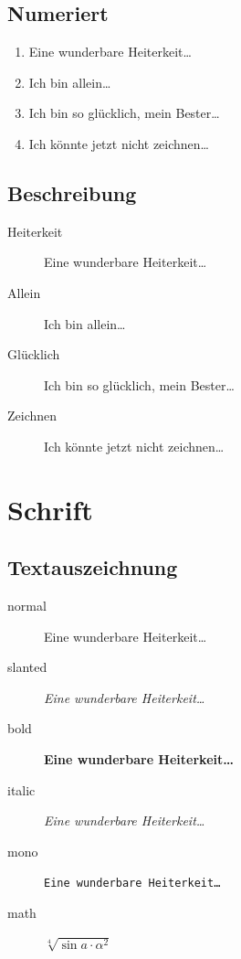 		\subsection{Numeriert}

		\begin{frame}{\insertsectionhead}{\insertsubsectionhead}
			\begin{enumerate}
				\item Eine wunderbare Heiterkeit\dots
				\item Ich bin allein\dots
				\item Ich bin so glücklich, mein Bester\dots
				\item Ich könnte jetzt nicht zeichnen\dots
			\end{enumerate}
		\end{frame}

		\subsection{Beschreibung}

		\begin{frame}{\insertsectionhead}{\insertsubsectionhead}
			\begin{description}
				\item[Heiterkeit] Eine wunderbare Heiterkeit\dots
				\item[Allein] Ich bin allein\dots
				\item[Glücklich] Ich bin so glücklich, mein Bester\dots
				\item[Zeichnen] Ich könnte jetzt nicht zeichnen\dots
			\end{description}
		\end{frame}


	\section{Schrift}

		\subsection{Textauszeichnung}

		\begin{frame}{\insertsectionhead}{\insertsubsectionhead}
			\begin{description}
				\item[normal] Eine wunderbare Heiterkeit\dots
				\item[slanted] \textsl{Eine wunderbare Heiterkeit\dots}
				\item[bold] \textbf{Eine wunderbare Heiterkeit\dots}
				\item[italic] \textit{Eine wunderbare Heiterkeit\dots}
				\item[mono] \texttt{Eine wunderbare Heiterkeit\dots}
				\item[math] $\sqrt[4]{\sin a \cdot \alpha^2}$
			\end{description}
		\end{frame}



